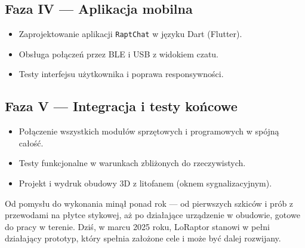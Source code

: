 \subsection*{Faza IV --- Aplikacja mobilna}

\begin{itemize}
	\item Zaprojektowanie aplikacji \texttt{RaptChat} w języku Dart (Flutter).
	\item Obsługa połączeń przez BLE i USB z widokiem czatu.
	\item Testy interfejsu użytkownika i poprawa responsywności.
\end{itemize}

\subsection*{Faza V --- Integracja i testy końcowe}

\begin{itemize}
	\item Połączenie wszystkich modułów sprzętowych i programowych w spójną całość.
	\item Testy funkcjonalne w warunkach zbliżonych do rzeczywistych.
	\item Projekt i wydruk obudowy 3D z litofanem (oknem sygnalizacyjnym).
\end{itemize}
\smallskip
Od pomysłu do wykonania minął ponad rok --- od pierwszych szkiców i prób z przewodami na płytce stykowej, aż po działające urządzenie w obudowie, gotowe do pracy w terenie. Dziś, w marcu 2025 roku, LoRaptor stanowi w pełni działający prototyp, który spełnia założone cele i może być dalej rozwijany.